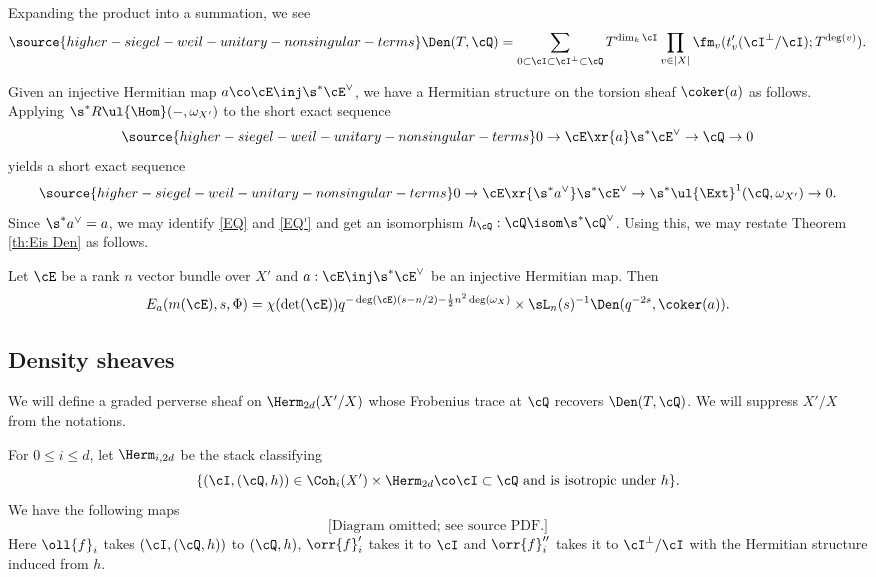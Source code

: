 Expanding the product into a summation, we see
\begin{equation}\label{Den sum}
\source{higher-siegel-weil-unitary-nonsingular-terms}
\Den(T, \cQ)=\sum_{0 \subset \cI \subset \cI^{\bot} \subset \cQ} T^{\dim_{k}\cI}\prod_{v\in |X|}\fm_{v}(t'_v(\cI^{\bot}/\cI);T^{\deg(v)}).
\end{equation}

Given an injective Hermitian map $a \co \cE \inj \s^* \cE^\vee$, we have a Hermitian structure on the torsion sheaf $\coker(a)$ as follows. Applying $\s^{*}R\ul{\Hom}(-,\omega_{X'})$ to the short exact sequence
\begin{equation}\label{EQ}
\source{higher-siegel-weil-unitary-nonsingular-terms}
0\to \cE\xr{a} \s^{*}\cE^{\vee}\to \cQ\to 0
\end{equation}
yields a short exact sequence
\begin{equation}\label{EQ'}
\source{higher-siegel-weil-unitary-nonsingular-terms}
0\to \cE\xr{\s^{*}a^{\vee}} \s^{*}\cE^{\vee}\to \s^{*}\ul{\Ext}^{1}(\cQ,\omega_{X'})\to 0.
\end{equation}
Since $\s^*a^{\vee}=a$, we may identify \eqref{EQ} and \eqref{EQ'} and get an isomorphism $h_{\cQ}: \cQ\isom \s^{*}\cQ^{\vee}$. Using this, we may restate Theorem \ref{th:Eis Den} as follows.
\begin{thm}
\notready\label{th:Eis Den torsion} Let $\cE$ be a rank $n$ vector bundle over $X'$ and $a:\cE\inj\s^{*}\cE^{\vee}$ be an injective Hermitian map. Then
\[
E_{a}(m(\cE),s,\Phi)=\chi(\det(\cE))q^{-\deg(\cE)( s-n/2)-\frac{1}{2}n^2\deg(\omega_X) }
\times \sL_n(s) ^{-1} \Den(q^{-2s}, \coker(a)).
\]
\end{thm}




\subsection{Density sheaves}
We will define a graded perverse sheaf on $\Herm_{2d}(X'/X)$ whose Frobenius trace at $\cQ$ recovers $\Den(T,\cQ)$.  We will suppress $X'/X$ from the notations.


For $0 \leq i \leq d$, let $\Herm_{i,2d}$ be the stack classifying
\[
\{ (\cI, (\cQ,h)) \in \Coh_i(X') \times \Herm_{2d} \co \text{$\cI\subset \cQ$ and is  isotropic under $h$}\}.
\]
We have the following maps
\begin{equation*}
\text{[Diagram omitted; see source PDF.]}
\end{equation*}
Here $\oll{f}_{i}$ takes $(\cI,(\cQ,h))$ to $(\cQ,h)$, $\orr{f}'_{i}$ takes it to $\cI$ and $\orr{f}''_{i}$ takes it to $\cI^{\bot}/\cI$ with the Hermitian structure induced from $h$.

